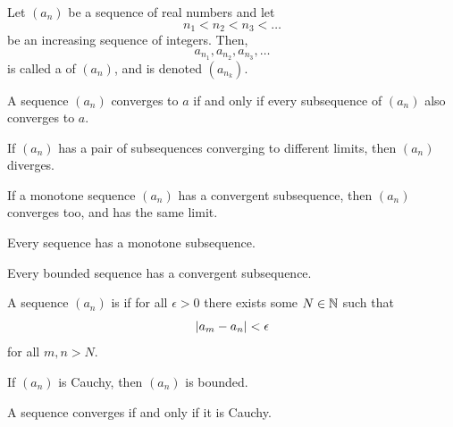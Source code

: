\documentclass[11pt,twoside=off,numbers=noenddot]{scrbook}
\begin{document}
\begin{definition}
    Let $(a_n)$ be a sequence of real numbers and let
    \[ n_1 < n_2 < n_3 < \dots \]
    be an increasing sequence of integers. Then,
    \[ a_{n_1}, a_{n_2}, a_{n_3}, \dots \]
    is called a  of $(a_n)$, and is denoted $(a_{n_k})$.
\end{definition}

\begin{proposition}
    A sequence $(a_n)$ converges to $a$ if and only if every subsequence of $(a_n)$ also converges to $a$.
\end{proposition}

\begin{corollary}
    If $(a_n)$ has a pair of subsequences converging to different limits, then $(a_n)$ diverges.
\end{corollary}

\begin{proposition}
    If a monotone sequence $(a_n)$ has a convergent subsequence, then $(a_n)$ converges too, and has the same limit.
\end{proposition}

\begin{lemma}
    Every sequence has a monotone subsequence.
\end{lemma}

\begin{theorem}
    Every bounded sequence has a convergent subsequence.
\end{theorem}

\begin{definition}
    A sequence $(a_n)$ is  if for all $\epsilon > 0$ there exists some $N \in \mathbb N$ such that
    \[ | a_m - a_n | < \epsilon \]
    for all $m, n > N$.
\end{definition}

\begin{lemma}
    If $(a_n)$ is Cauchy, then $(a_n)$ is bounded.
\end{lemma}

\begin{theorem}
    A sequence converges if and only if it is Cauchy.
\end{theorem}

\end{document}
